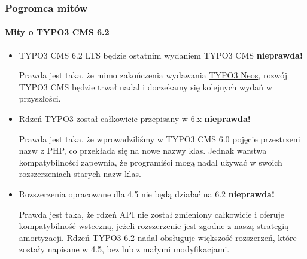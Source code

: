\begin{frame}[fragile]
	\frametitle{Pogromca mitów}
	\framesubtitle{Mity o TYPO3 CMS 6.2}

	\begin{itemize}
		\item TYPO3 CMS 6.2 LTS będzie ostatnim wydaniem TYPO3 CMS
			\tabto{9cm}\color{red}\textbf{\textrightarrow nieprawda!}\color{black}

			\smaller
				Prawda jest taka, że mimo zakończenia wydawania \href{http://neos.typo3.org}{TYPO3 Neos}, rozwój TYPO3 CMS będzie trwał nadal i doczekamy się kolejnych wydań w przyszłości.
			\normalsize

		\item Rdzeń TYPO3 został całkowicie przepisany w 6.x
			\tabto{9cm}\color{red}\textbf{\textrightarrow nieprawda!}\color{black}

			\smaller
				Prawda jest taka, że wprowadziliśmy w TYPO3 CMS 6.0 pojęcie przestrzeni nazw z PHP, co przekłada się na nowe nazwy klas. Jednak warstwa kompatybilności zapewnia, że programiści mogą nadal używać w swoich rozszerzeniach starych nazw klas.
			\normalsize

		\item Rozszerzenia opracowane dla 4.5 nie będą działać na 6.2
			\tabto{9cm}\color{red}\textbf{\textrightarrow nieprawda!}\color{black}

			\smaller
				Prawda jest taka, że rdzeń API nie został zmieniony całkowicie i oferuje kompatybilność wsteczną, jeżeli rozszerzenie jest zgodne z naszą \href{http://forge.typo3.org/projects/typo3v4-core/wiki/CoreDevPolicy}{strategią amortyzacji}. Rdzeń TYPO3 6.2 nadal obsługuje większość rozszerzeń, które zostały napisane w 4.5, bez lub z małymi modyfikacjami.
			\normalsize

	\end{itemize}

\end{frame}



